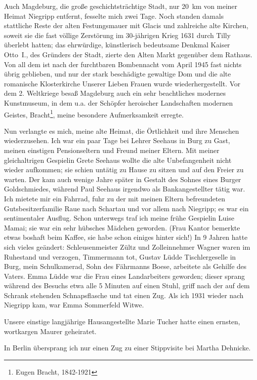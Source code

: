 \documentclass[a5paper,pagesize,10pt,twoside=true]{scrbook}
\renewcommand{\marginpar}[2][]{}
\begin{document}
Auch Magdeburg, die große geschichtsträchtige Stadt, nur 20~km von meiner Heimat Niegripp entfernt, fesselte mich zwei Tage. Noch standen damals stattliche Reste der alten Festungsmauer mit Glacis und zahlreiche alte Kirchen, soweit sie die fast völlige Zerstörung im 30-jährigen Krieg 1631 durch Tilly überlebt hatten; das ehrwürdige, künstlerisch bedeutsame Denkmal Kaiser Otto~I., des Gründers der Stadt, zierte den Alten Markt gegenüber dem Rathaus. Von all dem ist nach der furchtbaren Bombennacht vom April 1945 fast nichts übrig geblieben, und nur der stark beschädigte gewaltige Dom und die alte romanische Klosterkirche Unserer Lieben Frauen wurde wiederhergestellt. Vor dem 2. Weltkriege besaß Magdeburg auch ein sehr beachtliches modernes Kunstmuseum, in dem u.a. der Schöpfer heroischer Landschaften modernen Geistes, Bracht\footnote{Eugen Bracht, 1842-1921}, meine besondere Aufmerksamkeit erregte.

Nun verlangte es mich, meine alte Heimat, die Örtlichkeit und ihre Menschen wiederzusehen. Ich war ein paar Tage bei Lehrer Seehaus in Burg zu Gast, meinen einstigen Pensionseltern und Freund meiner Eltern. Mit meiner gleichaltrigen Gespielin Grete Seehaus wollte die alte Unbefangenheit nicht wieder aufkommen; sie schien untätig zu Hause zu sitzen und \marginpar{143} auf den Freier zu warten. Der kam auch wenige Jahre später in Gestalt des Sohnes eines Burger Goldschmiedes, während Paul Seehaus irgendwo als Bankangestellter tätig war. Ich mietete mir ein Fahrrad, fuhr zu der mit meinen Eltern befreundeten Gutsbesitzerfamilie Raue nach Schartau und vor allem nach Niegripp; es war ein sentimentaler Ausflug. Schon unterwegs traf ich meine frühe Gespielin Luise Mamai; sie war ein sehr hübsches Mädchen geworden. (Frau Kantor bemerkte etwas boshaft beim Kaffee, sie habe schon einiges hinter sich!) In 9 Jahren hatte sich vieles geändert: Schleusenmeister Zültz und Zolleinnehmer Wagner waren im Ruhestand und verzogen, Timmermann tot, Gustav Lüdde Tischlergeselle in Burg, mein Schulkamerad, Sohn des Fährmanns Boese, arbeitete als Gehilfe des Vaters. Emma Lüdde war die Frau eines Landarbeiters geworden; dieser sprang während des Besuchs etwa alle 5 Minuten auf einen Stuhl, griff nach der auf dem Schrank stehenden Schnapsflasche und tat einen Zug. Als ich 1931 wieder nach Niegripp kam, war Emma Sommerfeld Witwe.

Unsere einstige langjährige Hausangestellte Marie Tucher hatte einen ernsten, wortkargen Maurer geheiratet.

In Berlin übersprang ich nur einen Zug zu einer Stippvisite bei Martha Dehnicke.
\end{document}
